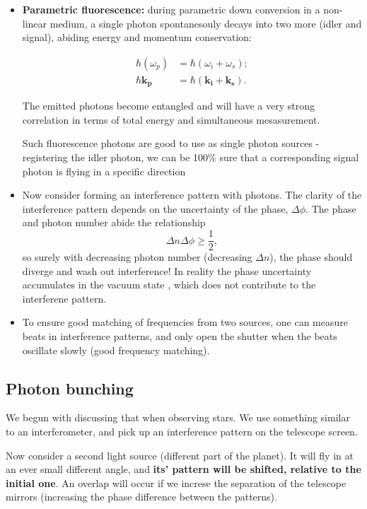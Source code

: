  \begin{itemize}
 	\item \textbf{Parametric fluorescence:} during parametric down conversion in a non-linear medium, a single photon spontanesouly decays into two more (idler and signal), abiding energy and momentum conservation:
 	
 	\begin{equation}\label{key}
 		\begin{aligned}
	 		\hbar(\omega_p) & = \hbar(\omega_i + \omega_s);\\
	 		\hbar\mathbf{k_p} & = \hbar(\mathbf{k_i} + \mathbf{k_s}).
 		\end{aligned}
 	\end{equation}
 	
 	\noindent The emitted photons become entangled and will have a very strong correlation in terms of total energy and simultaneous mesasurement.
 	
 	Such fluorescence photons are good to use as single photon sources - registering the idler photon, we can be 100\% sure that a corresponding signal photon is flying in a specific direction
 	\item Now consider forming an interference pattern with photons. The clarity of the interference pattern depends on the uncertainty of the phase, $ \Delta\phi $. The phase and photon number abide the relationship
 	\begin{equation}\label{key}
 		\Delta n\Delta\phi \ge\frac{1}{2},
 	\end{equation}
 	\noindent so surely with decreasing photon number (decreasing $ \Delta n $), the phase should diverge and wash out interference! \iRa In reality the phase uncertainty accumulates in the vacuum state , which does not contribute to the interferene pattern.
 	\item To ensure good matching of frequencies from two sources, one can measure beats in interference patterns, and only open the shutter when the beats oscillate slowly (good frequency matching).
 \end{itemize}

 \subsection{Photon bunching}
  We begun with discussing that when observing stars. We use something similar to an interferometer, and pick up an interference pattern on the telescope screen.
  
  Now consider a second light source (different part of the planet). It will fly in at an ever small different angle, and \textbf{its' pattern will be shifted, relative to the initial one}. An overlap will occur if we increse the separation of the telescope mirrors (increasing the phase difference between the patterns). 
  
